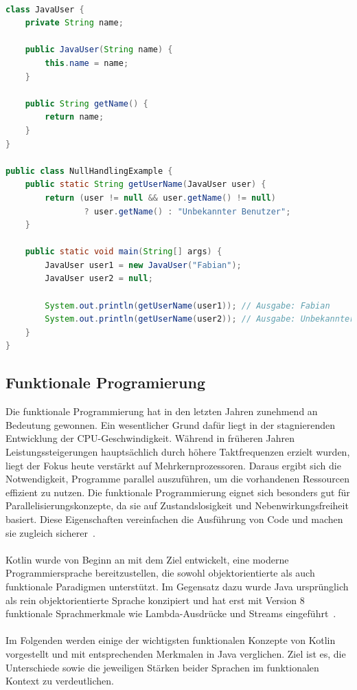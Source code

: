 \documentclass[11pt]{article}
\begin{document}
    \begin{lstlisting}[language=Java, caption={NullHandlingExample.java}, label={lst:java-user-null-safety}]

class JavaUser {
    private String name;

    public JavaUser(String name) {
        this.name = name;
    }

    public String getName() {
        return name;
    }
}

public class NullHandlingExample {
    public static String getUserName(JavaUser user) {
        return (user != null && user.getName() != null)
                ? user.getName() : "Unbekannter Benutzer";
    }

    public static void main(String[] args) {
        JavaUser user1 = new JavaUser("Fabian");
        JavaUser user2 = null;

        System.out.println(getUserName(user1)); // Ausgabe: Fabian
        System.out.println(getUserName(user2)); // Ausgabe: Unbekannter Benutzer
    }
}
    \end{lstlisting}

    \subsection{Funktionale Programierung}

    Die funktionale Programmierung hat in den letzten Jahren zunehmend an Bedeutung gewonnen.
    Ein wesentlicher Grund dafür liegt in der stagnierenden Entwicklung der CPU-Geschwindigkeit.
    Während in früheren Jahren Leistungssteigerungen hauptsächlich durch höhere Taktfrequenzen erzielt wurden, liegt der Fokus heute verstärkt auf Mehrkernprozessoren.
    Daraus ergibt sich die Notwendigkeit, Programme parallel auszuführen, um die vorhandenen Ressourcen effizient zu nutzen.
    Die funktionale Programmierung eignet sich besonders gut für Parallelisierungskonzepte, da sie auf Zustandslosigkeit und Nebenwirkungsfreiheit basiert.
    Diese Eigenschaften vereinfachen die Ausführung von Code und machen sie zugleich sicherer~\cite[129]{kotlin-patterns}.\\
    \\
    Kotlin wurde von Beginn an mit dem Ziel entwickelt, eine moderne Programmiersprache bereitzustellen, die sowohl objektorientierte als auch funktionale Paradigmen unterstützt.
    Im Gegensatz dazu wurde Java ursprünglich als rein objektorientierte Sprache konzipiert und hat erst mit Version 8 funktionale Sprachmerkmale wie Lambda-Ausdrücke und Streams eingeführt~\cite[54]{insel}.\\
    \\
    Im Folgenden werden einige der wichtigsten funktionalen Konzepte von Kotlin vorgestellt und mit entsprechenden Merkmalen in Java verglichen.
    Ziel ist es, die Unterschiede sowie die jeweiligen Stärken beider Sprachen im funktionalen Kontext zu verdeutlichen.
\end{document}
